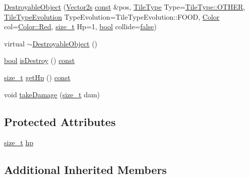 \begin{DoxyCompactItemize}
\item 
\hyperlink{classarcade_1_1_destroyable_object_a728b8d7f5050dd691d1bcb8ddf8bdf97}{Destroyable\-Object} (\hyperlink{namespacearcade_a8e527f7400fbff9c38dc31e0a3dd06a1}{Vector2s} \hyperlink{term__entry_8h_a57bd63ce7f9a353488880e3de6692d5a}{const} \&pos, \hyperlink{namespacearcade_a61ba576694ea309cdf2b4b66902408ca}{Tile\-Type} Type=\hyperlink{namespacearcade_a61ba576694ea309cdf2b4b66902408caa03570470bad94692ce93e32700d2e1cb}{Tile\-Type\-::\-O\-T\-H\-E\-R}, \hyperlink{namespacearcade_a2e0a64a64203f78c9efb84a1475a8cf4}{Tile\-Type\-Evolution} Type\-Evolution=Tile\-Type\-Evolution\-::\-F\-O\-O\-D, \hyperlink{unionarcade_1_1_color}{Color} col=\hyperlink{unionarcade_1_1_color_a7101e34126fdb3c14d53045681938293}{Color\-::\-Red}, \hyperlink{nc__alloc_8h_a7b60c5629e55e8ec87a4547dd4abced4}{size\-\_\-t} Hp=1, \hyperlink{term__entry_8h_a002004ba5d663f149f6c38064926abac}{bool} collide=\hyperlink{_snake_8cpp_ae6c865df784842196d411c1466b01686}{false})
\item 
virtual \hyperlink{classarcade_1_1_destroyable_object_acf852eba3eb688c8b555e120edc957fb}{$\sim$\-Destroyable\-Object} ()
\item 
\hyperlink{term__entry_8h_a002004ba5d663f149f6c38064926abac}{bool} \hyperlink{classarcade_1_1_destroyable_object_a38a45eb4ec9bcfbc96fbdaa7137fe2da}{is\-Destroy} () \hyperlink{term__entry_8h_a57bd63ce7f9a353488880e3de6692d5a}{const} 
\item 
\hyperlink{nc__alloc_8h_a7b60c5629e55e8ec87a4547dd4abced4}{size\-\_\-t} \hyperlink{classarcade_1_1_destroyable_object_a1652cda5f700e3f2f53ca3c1182510d8}{get\-Hp} () \hyperlink{term__entry_8h_a57bd63ce7f9a353488880e3de6692d5a}{const} 
\item 
void \hyperlink{classarcade_1_1_destroyable_object_a7bf3f7a488657dc421b451953271c03d}{take\-Damage} (\hyperlink{nc__alloc_8h_a7b60c5629e55e8ec87a4547dd4abced4}{size\-\_\-t} dam)
\end{DoxyCompactItemize}
\subsection*{Protected Attributes}
\begin{DoxyCompactItemize}
\item 
\hyperlink{nc__alloc_8h_a7b60c5629e55e8ec87a4547dd4abced4}{size\-\_\-t} \hyperlink{classarcade_1_1_destroyable_object_af7140571a87e2769fe96872662cb125c}{hp}
\end{DoxyCompactItemize}
\subsection*{Additional Inherited Members}


